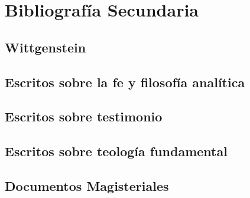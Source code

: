 \documentclass[11pt]{article}
\begin{document}
\nocite{lcateichref}
\nocite{philteichref}
\nocite{oncertref}
\printbibliography[heading=none,keyword=estudios]

\section{Bibliografía Secundaria}
\subsection{Wittgenstein}
\nocite{tractatusref}
\nocite{philinvref}
\nocite{oncertref}
\nocite{notebooksref}
\printbibliography[heading=none,keyword=witt]
\subsection{Escritos sobre la fe y filosofía analítica}
\nocite{antiseriref}
\nocite{cycref}
\printbibliography[heading=none,keyword=fefilo]
\subsection{Escritos sobre testimonio}
\nocite{testcoadyref}
\nocite{dicctfref}
\nocite{ftcpelliteroref}
\nocite{callaghanref}
\nocite{feylogicaconesaref}
\printbibliography[heading=none,keyword=testimonio]
\subsection{Escritos sobre teología fundamental}
\nocite{pradesmulticrref}
\nocite{CITFref}
\printbibliography[heading=none,keyword=tfund]

\subsection{Documentos Magisteriales}

\nocite{dvref}
\nocite{lgref}
\nocite{gsref}
\nocite{frref}
\printbibliography[heading=none,keyword=mag]
\end{document}
